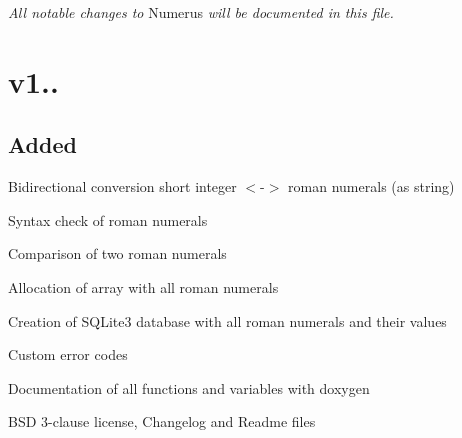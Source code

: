 {\itshape All notable changes to} Numerus {\itshape will be documented in this file.}





\section*{v1.. }

\subsection*{Added }


\begin{DoxyItemize}
\item Bidirectional conversion short integer $<$-\/$>$ roman numerals (as string)
\item Syntax check of roman numerals
\item Comparison of two roman numerals
\item Allocation of array with all roman numerals
\item Creation of S\+Q\+Lite3 database with all roman numerals and their values
\item Custom error codes
\item Documentation of all functions and variables with doxygen
\item B\+S\+D 3-\/clause license, Changelog and Readme files 
\end{DoxyItemize}
